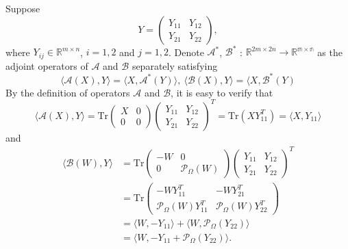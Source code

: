 \documentclass{article}
\begin{document}
{Suppose
\begin{equation*}
	Y = \begin{pmatrix}
		Y_{11} & Y_{12} \\
		Y_{21} & Y_{22}
	\end{pmatrix},
\end{equation*}
where $Y_{ij} \in \mathbb{R}^{m \times n}$, $i=1,2$ and $j=1,2$. Denote $\mathcal{A}^*$, $\mathcal{B}^*$ : $\mathbb{R}^{2m \times 2n} \rightarrow \mathbb{R^{m \times n}} $ as the adjoint operators of $\mathcal{A}$ and $\mathcal{B}$ separately satisfying 
\begin{equation}
	\label{adjopt}
	\langle \mathcal{A}(X),Y \rangle = \langle X,\mathcal{A}^*(Y) \rangle,\ \langle \mathcal{B}(X),Y \rangle =  \langle X,\mathcal{B}^*(Y)
\end{equation}
By the definition of operators $\mathcal{A}$ and $\mathcal{B}$, it is easy to verify that
\begin{equation*}
	\langle \mathcal{A}(X),Y \rangle = \text{Tr}\begin{pmatrix}
		X & 0 \\
		0 & 0 
	\end{pmatrix}\begin{pmatrix}
		Y_{11} & Y_{12} \\
		Y_{21} & Y_{22}
	\end{pmatrix}^T = \text{Tr}(XY_{11}^T) = \langle X,Y_{11} \rangle
\end{equation*}
and 
\begin{equation*}
	\begin{aligned}
		\langle \mathcal{B}(W),Y \rangle & = \text{Tr}\begin{pmatrix}
			-W & 0 \\
			0 & \mathcal{P}_\Omega(W) 
		\end{pmatrix}\begin{pmatrix}
			Y_{11} & Y_{12} \\
			Y_{21} & Y_{22}
		\end{pmatrix}^T \\
		& = \text{Tr}\begin{pmatrix}
			-WY_{11}^T & -WY_{21}^T \\
			\mathcal{P}_\Omega(W)Y_{11}^T & \mathcal{P}_\Omega(W)Y_{22}^T
		\end{pmatrix}\\
		&= \langle W, -Y_{11} \rangle + \langle W, \mathcal{P}_\Omega(Y_{22}) \rangle \\
		& = \langle W, -Y_{11}+ \mathcal{P}_\Omega(Y_{22})  \rangle.
	\end{aligned}
\end{equation*}

}
\end{document}
